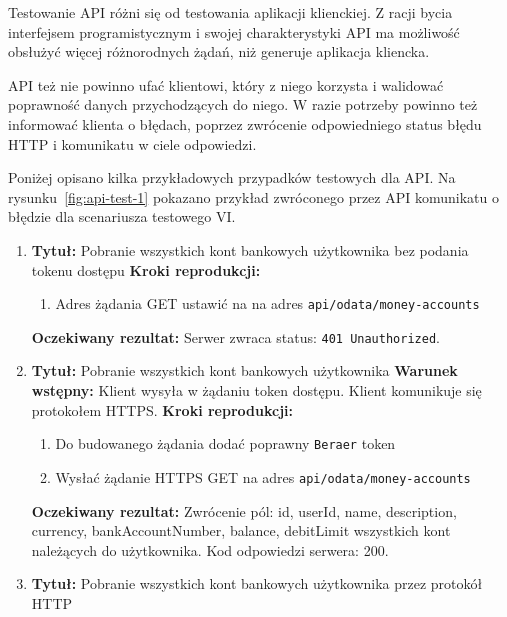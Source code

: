 Testowanie API różni się od testowania aplikacji klienckiej. Z racji bycia interfejsem programistycznym i swojej charakterystyki API ma możliwość obsłużyć więcej różnorodnych żądań, niż generuje aplikacja kliencka. 

API też nie powinno ufać klientowi, który z niego korzysta i walidować poprawność danych przychodzących do niego. W razie potrzeby powinno też informować klienta o błędach, poprzez zwrócenie odpowiedniego status błędu HTTP i komunikatu w ciele odpowiedzi.

Poniżej opisano kilka przykładowych przypadków testowych dla API. Na rysunku~\ref{fig:api-test-1} pokazano przykład zwróconego przez API komunikatu o błędzie dla scenariusza testowego VI.

\begin{enumerate}[labelwidth=1em,label=\Roman*]
\item 
    \textbf{Tytuł:} Pobranie wszystkich kont bankowych użytkownika bez podania tokenu dostępu \newline
    \textbf{Kroki reprodukcji:}  \begin{enumerate}[label=\arabic*.]
        \item Adres żądania GET ustawić na na adres \texttt{api/odata/money-accounts}
    \end{enumerate}
    \textbf{Oczekiwany rezultat:}  Serwer zwraca status: \texttt{401 Unauthorized}. \newline
\item 
    \textbf{Tytuł:} Pobranie wszystkich kont bankowych użytkownika \newline
    \textbf{Warunek wstępny:} Klient wysyła w żądaniu token dostępu. Klient komunikuje się protokołem HTTPS. \newline
    \textbf{Kroki reprodukcji:}  \begin{enumerate}[label=\arabic*.]
        \item Do budowanego żądania dodać poprawny \texttt{Beraer} token 
        \item Wysłać żądanie HTTPS GET na adres \texttt{api/odata/money-accounts}
    \end{enumerate}
    \textbf{Oczekiwany rezultat:}  Zwrócenie pól: id, userId, name, description, currency, bankAccountNumber, balance, debitLimit wszystkich kont należących do użytkownika. Kod odpowiedzi serwera: 200. \newline
\item 
    \textbf{Tytuł:} Pobranie wszystkich kont bankowych użytkownika przez protokół HTTP  \newline

\end{enumerate}
